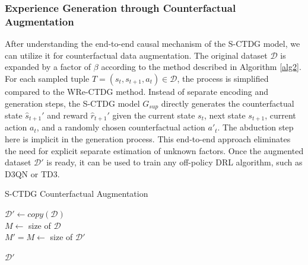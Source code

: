 \subsubsection{Experience Generation through Counterfactual Augmentation}

After understanding the end-to-end causal mechanism of the S-CTDG model,
we can utilize it for counterfactual data augmentation.
The original dataset $\mathcal{D}$ is expanded by a factor of $\beta$
according to the method described in Algorithm \ref{alg2}.
For each sampled tuple
$T = (s_t, s_{t+1}, a_t) \in \mathcal{D}$,
the process is simplified compared to the WRe-CTDG method.
Instead of separate encoding and generation steps,
the S-CTDG model $G_{sup}$ directly generates the counterfactual
state $\hat{s}_{t+1}'$ and reward $\hat{r}_{t+1}'$
given the current state $s_t$, next state $s_{t+1}$,
current action $a_t$, and a randomly chosen counterfactual action $a'_t$.
The abduction step here is implicit in the generation process.
This end-to-end approach eliminates the need for explicit
separate estimation of unknown factors.
Once the augmented dataset $\mathcal{D}'$ is ready, it can be used to
train any off-policy DRL algorithm, such as D3QN or TD3.

\begin{algorithm}[hb]
    \small
    \caption{S-CTDG Counterfactual Augmentation} \label{alg2}
    
    \vspace{1pt}
    
    
    \BlankLine
    $\mathcal{D'} \gets copy(\mathcal{D})$ \\
    $M \gets$ size of $\mathcal{D}$ \\
    $M' = M \gets$ size of $\mathcal{D'}$ \\
    
    \BlankLine
    \Return $\mathcal{D}'$
    \vspace{2pt}
\end{algorithm}